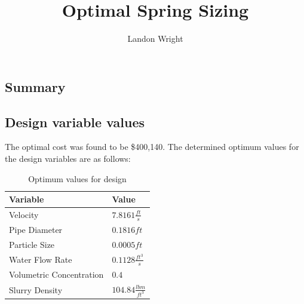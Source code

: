 \documentclass{article}
\begin{document}
\title{Optimal Spring Sizing}
\author{Landon Wright}
\maketitle
\begin{centering}
\section*{Summary}

\end{centering}
\subsection{Design variable values}
The optimal cost was found to be \$400,140.
The determined optimum values for the design variables are as follows:

\begin{table}[H]
\centering
\caption{Optimum values for design}
\label{tab:optimum values}
\begin{tabular}{ll}
\hline
\textbf{Variable}      & \textbf{Value} \\
\hline
Velocity & $7.8161 \frac{ft}{s}$ \\
Pipe Diameter & $0.1816 ft$ \\
Particle Size  & $0.0005 ft$    \\
Water Flow Rate   & $0.1128 \frac{ft^{3}}{s}$\\
Volumetric Concentration & $0.4$\\
Slurry Density & $104.84 \frac{lbm}{ft^{3}}$\\

\hline
\end{tabular}
\end{table}
\end{document}
